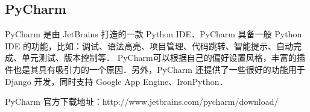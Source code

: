
\begin{issues}
\issueDraft
\issueTODO
\end{issues}

\subsection{PyCharm}
  PyCharm 是由 JetBrains 打造的一款 Python IDE．PyCharm 具备一般 Python IDE 的功能，比如：调试、语法高亮、项目管理、代码跳转、智能提示、自动完成、单元测试、版本控制等． PyCharm可以根据自己的偏好设置风格，丰富的插件也是其具有吸引力的一个原因．另外，PyCharm 还提供了一些很好的功能用于 Django 开发，同时支持 Google App Engine、IronPython．

  PyCharm 官方下载地址：http://www.jetbrains.com/pycharm/download/
